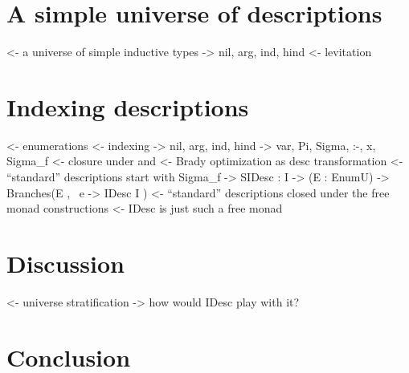 \documentclass[preprint, authoryear]{sigplanconf}
\newenvironment{structure}{\footnotesize\verbatim}{\endverbatim}
\begin{document}

\section{A simple universe of descriptions}

\begin{structure}
<- a universe of simple inductive types
    -> nil, arg, ind, hind
<- levitation
\end{structure}


\section{Indexing descriptions}


\begin{structure}
<- enumerations
<- indexing
    -> nil, arg, ind, hind
    -> var, Pi, Sigma, :-, x, Sigma_f
<- closure under \box and \diamond
<- Brady optimization as desc transformation
<- ``standard'' descriptions start with Sigma_f
    -> SIDesc : I -> (E : EnumU) -> Branches(E , \ e -> IDesc I )
<- ``standard'' descriptions closed under the free monad constructions
<- IDesc is just such a free monad
\end{structure}


\section{Discussion}

\begin{structure}
<- universe stratification
    -> how would IDesc play with it?
\end{structure}



\section{Conclusion}
\end{document}
